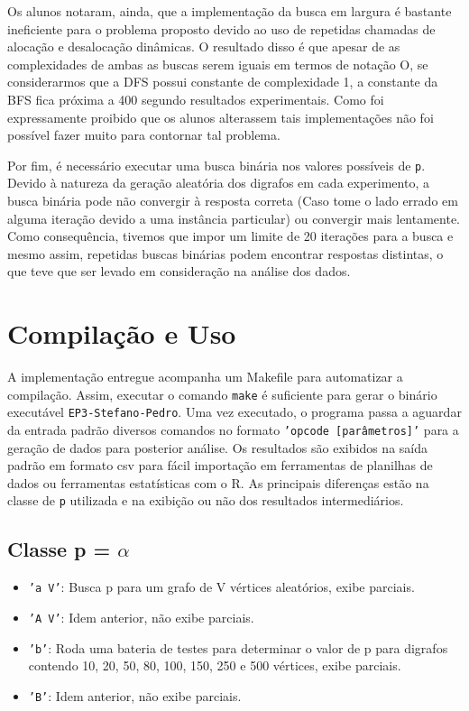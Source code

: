 \documentclass[brazil,times]{abnt}
\begin{document}
Os alunos notaram, ainda, que a implementação da busca em largura é bastante ineficiente para o problema proposto devido ao uso de repetidas chamadas de alocação e desalocação dinâmicas. O resultado disso é que apesar de as complexidades de ambas as buscas serem iguais em termos de notação O, se considerarmos que a DFS possui constante de complexidade 1, a constante da BFS fica próxima a 400 segundo resultados experimentais. Como foi expressamente proibido que os alunos alterassem tais implementações não foi possível fazer muito para contornar tal problema.

Por fim, é necessário executar uma busca binária nos valores possíveis de \texttt{p}. Devido à natureza da geração aleatória dos digrafos em cada experimento, a busca binária pode não convergir à resposta correta (Caso tome o lado errado em alguma iteração devido a uma instância particular) ou convergir mais lentamente. Como consequência, tivemos que impor um limite de 20 iterações para a busca e mesmo assim, repetidas buscas binárias podem encontrar respostas distintas, o que teve que ser levado em consideração na análise dos dados.


\section*{Compilação e Uso}
A implementação entregue acompanha um Makefile para automatizar a compilação. Assim, executar o comando \texttt{make} é suficiente para gerar o binário executável \texttt{EP3-Stefano-Pedro}. Uma vez executado, o programa passa a aguardar da entrada padrão diversos comandos no formato \texttt{'opcode [parâmetros]'} para a geração de dados para posterior análise. Os resultados são exibidos na saída padrão em formato csv para fácil importação em ferramentas de planilhas de dados ou ferramentas estatísticas com o R. As principais diferenças estão na classe de \texttt{p} utilizada e na exibição ou não dos resultados intermediários.

\subsection*{Classe p = $\alpha$}
\begin{itemize}
	\item[] \texttt{'a V'}: Busca p para um grafo de V vértices aleatórios, exibe parciais.
	\item[] \texttt{'A V'}: Idem anterior, não exibe parciais.
	\item[] \texttt{'b'}: Roda uma bateria de testes para determinar o valor de p para digrafos contendo 10, 20, 50, 80, 100, 150, 250 e 500 vértices, exibe parciais.
	\item[] \texttt{'B'}: Idem anterior, não exibe parciais.
\end{itemize}
\end{document}
